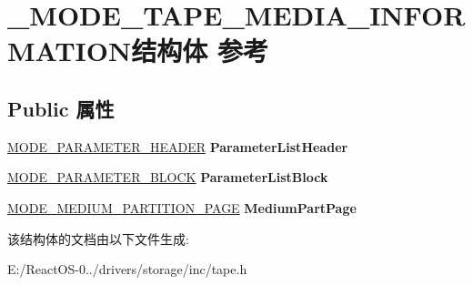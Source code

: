 \hypertarget{struct___m_o_d_e___t_a_p_e___m_e_d_i_a___i_n_f_o_r_m_a_t_i_o_n}{}\section{\+\_\+\+M\+O\+D\+E\+\_\+\+T\+A\+P\+E\+\_\+\+M\+E\+D\+I\+A\+\_\+\+I\+N\+F\+O\+R\+M\+A\+T\+I\+O\+N结构体 参考}
\label{struct___m_o_d_e___t_a_p_e___m_e_d_i_a___i_n_f_o_r_m_a_t_i_o_n}
\subsection*{Public 属性}
\begin{DoxyCompactItemize}
\item 
\mbox{\label{struct___m_o_d_e___t_a_p_e___m_e_d_i_a___i_n_f_o_r_m_a_t_i_o_n_ad370367595855c6b47d2a266bc895d11}} 
\hyperlink{struct___m_o_d_e___p_a_r_a_m_e_t_e_r___h_e_a_d_e_r}{M\+O\+D\+E\+\_\+\+P\+A\+R\+A\+M\+E\+T\+E\+R\+\_\+\+H\+E\+A\+D\+ER} {\bfseries Parameter\+List\+Header}
\item 
\mbox{\label{struct___m_o_d_e___t_a_p_e___m_e_d_i_a___i_n_f_o_r_m_a_t_i_o_n_a3b331ea946991d87b3e9b9f233468171}} 
\hyperlink{struct___m_o_d_e___p_a_r_a_m_e_t_e_r___b_l_o_c_k}{M\+O\+D\+E\+\_\+\+P\+A\+R\+A\+M\+E\+T\+E\+R\+\_\+\+B\+L\+O\+CK} {\bfseries Parameter\+List\+Block}
\item 
\mbox{\label{struct___m_o_d_e___t_a_p_e___m_e_d_i_a___i_n_f_o_r_m_a_t_i_o_n_afbbf10df789099b19ddb1e1f9ecafe45}} 
\hyperlink{struct___m_o_d_e___m_e_d_i_u_m___p_a_r_t_i_t_i_o_n___p_a_g_e}{M\+O\+D\+E\+\_\+\+M\+E\+D\+I\+U\+M\+\_\+\+P\+A\+R\+T\+I\+T\+I\+O\+N\+\_\+\+P\+A\+GE} {\bfseries Medium\+Part\+Page}
\end{DoxyCompactItemize}


该结构体的文档由以下文件生成\+:\begin{DoxyCompactItemize}
\item 
E\+:/\+React\+O\+S-\/0../drivers/storage/inc/tape.\+h\end{DoxyCompactItemize}
